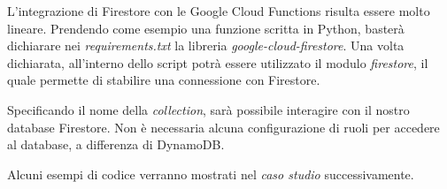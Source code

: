 L'integrazione di Firestore con le Google Cloud Functions risulta essere molto lineare. Prendendo come esempio una funzione scritta in Python, basterà dichiarare nei \textit{requirements.txt} la libreria \textit{google-cloud-firestore}. Una volta dichiarata, all'interno dello script potrà essere utilizzato il modulo \textit{firestore}, il quale permette di stabilire una connessione con Firestore.

Specificando il nome della \textit{collection}, sarà possibile interagire con il nostro database Firestore. Non è necessaria alcuna configurazione di ruoli per accedere al database, a differenza di DynamoDB.

Alcuni esempi di codice verranno mostrati nel \textit{caso studio} successivamente.